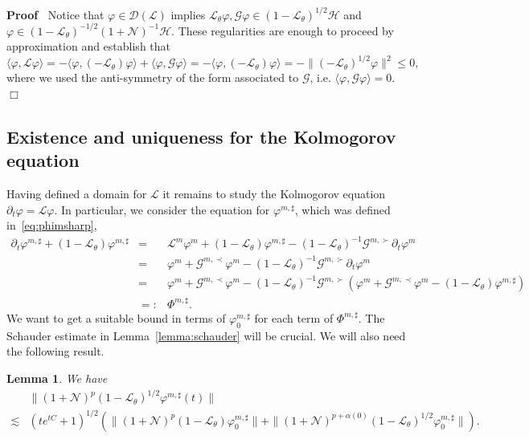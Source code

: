 \documentclass[10pt]{article}
\newcommand{\backassign}{=:}
\newenvironment{proof}{\noindent\textbf{Proof\ }}{\hspace*{\fill}$\Box$\medskip}
\newtheorem{lemma}{Lemma}
\begin{document}
\begin{proof}
  Notice that $\varphi \in \mathcal{D} (\mathcal{L})$ implies
  $\mathcal{L}_{\theta} \varphi, \mathcal{G} \varphi \in (1
  -\mathcal{L}_{\theta})^{1 / 2} \mathcal{H}$ and $\varphi \in (1
  -\mathcal{L}_{\theta})^{- 1 / 2} (1 +\mathcal{N})^{- 1} \mathcal{H}$. These
  regularities are enough to proceed by approximation and establish that
  \[ \langle \varphi, \mathcal{L} \varphi \rangle = - \langle \varphi,
     (-\mathcal{L}_{\theta}) \varphi \rangle + \langle \varphi, \mathcal{G}
     \varphi \rangle = - \langle \varphi, (-\mathcal{L}_{\theta}) \varphi
     \rangle = - \| (-\mathcal{L}_{\theta})^{1 / 2} \varphi \|^2 \leqslant 0,
  \]
  where we used the anti-symmetry of the form associated to $\mathcal{G}$,
  i.e. $\langle \varphi, \mathcal{G} \varphi \rangle = 0$.
\end{proof}

\subsection{Existence and uniqueness for the Kolmogorov equation}

Having defined a domain for $\mathcal{L}$ it remains to study the Kolmogorov
equation $\partial_t \varphi =\mathcal{L} \varphi$. In particular, we consider
the equation for $\varphi^{m, \sharp}$, which was defined
in~{\eqref{eq:phimsharp}},
\[ \begin{array}{lll}
     \partial_t \varphi^{m, \sharp} + (1 -\mathcal{L}_{\theta}) \varphi^{m,
     \sharp} & = & \mathcal{L}^m \varphi^m + (1 -\mathcal{L}_{\theta})
     \varphi^{m, \sharp} - (1 -\mathcal{L}_{\theta})^{- 1} \mathcal{G}^{m,
     \succ} \partial_t \varphi^m\\
     & = & \varphi^m +\mathcal{G}^{m, \prec} \varphi^m - (1
     -\mathcal{L}_{\theta})^{- 1} \mathcal{G}^{m, \succ} \partial_t
     \varphi^m\\
     & = & \varphi^m +\mathcal{G}^{m, \prec} \varphi^m - (1
     -\mathcal{L}_{\theta})^{- 1} \mathcal{G}^{m, \succ} (\varphi^m
     +\mathcal{G}^{m, \prec} \varphi^m - (1 -\mathcal{L}_{\theta}) \varphi^{m,
     \sharp})\\
     & \backassign & \Phi^{m, \sharp} .
   \end{array} \]
We want to get a suitable bound in terms of $\varphi^{m, \sharp}_0$ for each
term of $\Phi^{m, \sharp}$. The Schauder estimate in
Lemma~\ref{lemma:schauder} will be crucial. We will also need the following
result.

\begin{lemma}
  We have
  \begin{equation}
    \begin{array}{ll}
      & \| (1 +\mathcal{N})^p (1 -\mathcal{L}_{\theta})^{1 / 2} \varphi^{m,
      \sharp} (t) \|\\
      \lesssim & (t e^{t C} + 1)^{1 / 2} (\| (1 +\mathcal{N})^p (1
      -\mathcal{L}_{\theta}) \varphi_0^{m, \sharp} \| + \| (1 +\mathcal{N})^{p
      + \alpha (0)} (1 -\mathcal{L}_{\theta})^{1 / 2} \varphi_0^{m, \sharp}
      \|) .
    \end{array} \label{eq:est-phi-sharp}
  \end{equation}
\end{lemma}
\end{document}
